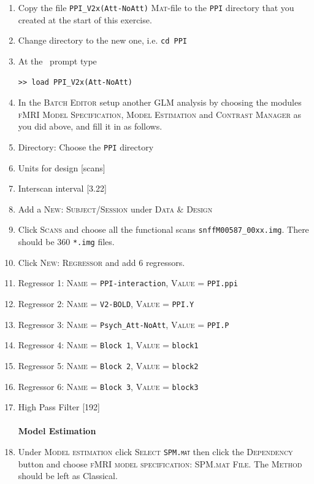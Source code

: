 \begin{enumerate}
\item Copy the file \texttt{PPI\_V2x(Att-NoAtt)} \textsc{Mat}-file to the \texttt{PPI} directory that you created at the start of this exercise.
\item Change directory to the new one, i.e. \texttt{cd PPI}
\item At the \matlab\ prompt type
\begin{verbatim}
>> load PPI_V2x(Att-NoAtt)
\end{verbatim}

\item In the \textsc{Batch Editor} setup another GLM analysis by choosing the modules \textsc{fMRI Model Specification}, \textsc{Model Estimation} and \textsc{Contrast Manager} as you did above, and fill it in as follows.
\item Directory: Choose the \texttt{PPI} directory
\item Units for design [scans]
\item Interscan interval [3.22]
\item Add a \textsc{New: Subject/Session} under \textsc{Data \& Design}
\item Click \textsc{Scans} and choose all the functional scans \texttt{snffM00587\_00xx.img}. There should be 360 \texttt{*.img} files.
\item Click \textsc{New: Regressor} and add 6 regressors.
\item Regressor 1: \textsc{Name} = \texttt{PPI-interaction}, \textsc{Value} = \texttt{PPI.ppi}
\item Regressor 2: \textsc{Name} = \texttt{V2-BOLD}, \textsc{Value} = \texttt{PPI.Y}
\item Regressor 3: \textsc{Name} = \texttt{Psych\_Att-NoAtt}, \textsc{Value} = \texttt{PPI.P}
\item Regressor 4: \textsc{Name} = \texttt{Block 1}, \textsc{Value} = \texttt{block1}
\item Regressor 5: \textsc{Name} = \texttt{Block 2}, \textsc{Value} = \texttt{block2}
\item Regressor 6: \textsc{Name} = \texttt{Block 3}, \textsc{Value} = \texttt{block3}
\item High Pass Filter [192]\\\\

\textbf{Model Estimation}
\item Under \textsc{Model estimation} click \textsc{Select \texttt{SPM.mat}} then click the \textsc{Dependency} button and choose \textsc{fMRI model specification: SPM.mat File}. The \textsc{Method} should be left as Classical.\\\\


\end{enumerate}
